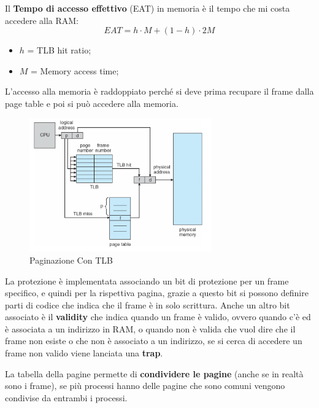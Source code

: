 \documentclass[12pt]{article}
\begin{document}
\begin{center}
\end{center}


Il \textbf{Tempo di accesso effettivo} (EAT) in memoria \`e il tempo che mi costa accedere alla RAM:
\[ EAT = h \cdot M + (1 - h) \cdot 2M  \]
\begin{itemize}
  \item $h$ = TLB hit ratio;
  \item $M$ = Memory access time;
\end{itemize}
L'accesso alla memoria \`e raddoppiato perch\'e si deve prima recupare il frame dalla page table e poi si pu\`o accedere alla memoria.
\begin{figure}[H]
  \centering
  \includegraphics[width=0.7\textwidth]{paginazione-con-tlb.png}
  \caption{Paginazione Con TLB}
  \label{fig:paginazione-con-tlb}
\end{figure}
La protezione \`e implementata associando un bit di protezione per un frame specifico, e quindi per la rispettiva pagina, grazie a questo bit si possono definire parti di codice che indica che il frame \`e in solo scrittura. Anche un altro bit associato \`e il \textbf{validity} che indica quando un frame \`e valido, ovvero quando c'\`e ed \`e associata a un indirizzo in RAM, o quando non \`e valida che vuol dire che il frame non esiste o che non \`e associato a un indirizzo, se si cerca di accedere un frame non valido viene lanciata una \textbf{trap}.

La tabella della pagine permette di \textbf{condividere le pagine} (anche se in realt\`a sono i frame), se pi\`u processi hanno delle pagine che sono comuni vengono condivise da entrambi i processi.
\end{document}
